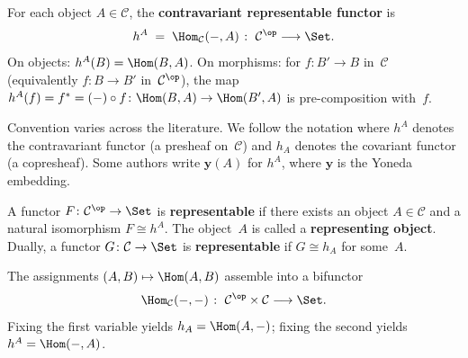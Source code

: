 \begin{definition}\label{def:h-upper}
For each object $A\in\mathcal{C}$, the \textbf{contravariant representable
functor} is
\[
    h^A \;=\; \Hom_{\mathcal{C}}(-,A) \;\colon\;
    \mathcal{C}^{\op} \longrightarrow \Set.
\]
On objects: $h^A(B) = \Hom(B,A)$.
On morphisms: for $f\colon B'\to B$ in~$\mathcal{C}$ (equivalently
$f\colon B\to B'$ in~$\mathcal{C}^{\op}$), the map
$h^A(f) = f^* = (-)\circ f\colon \Hom(B,A)\to\Hom(B',A)$
is pre-composition with~$f$.
\end{definition}

\begin{remark}\label{rem:representable-conventions}
Convention varies across the literature.  We follow the notation where
$h^A$ denotes the contravariant functor (a presheaf on~$\mathcal{C}$)
and $h_A$ denotes the covariant functor (a copresheaf).
Some authors write $\mathbf{y}(A)$ for $h^A$, where $\mathbf{y}$ is the
Yoneda embedding.
\end{remark}

\begin{definition}\label{def:representable}
A functor $F\colon\mathcal{C}^{\op}\to\Set$ is \textbf{representable}
if there exists an object $A\in\mathcal{C}$ and a natural isomorphism
$F\cong h^A$.  The object~$A$ is called a \textbf{representing object}.
Dually, a functor $G\colon\mathcal{C}\to\Set$ is \textbf{representable}
if $G\cong h_A$ for some~$A$.
\end{definition}

\begin{notation}\label{not:hom-bifunctor}
The assignments $(A,B)\mapsto\Hom(A,B)$ assemble into a bifunctor
\[
    \Hom_{\mathcal{C}}(-,-) \;\colon\;
    \mathcal{C}^{\op}\times\mathcal{C} \longrightarrow \Set.
\]
Fixing the first variable yields $h_A = \Hom(A,-)$; fixing the second
yields $h^A = \Hom(-,A)$.
\end{notation}

